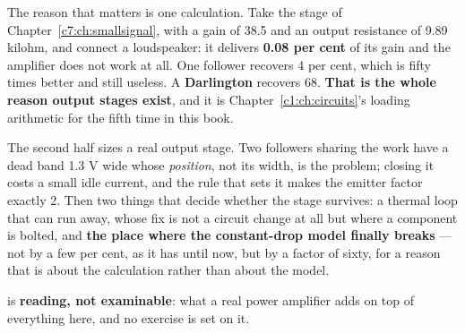 The reason that matters is one calculation. Take the stage of Chapter~\ref{c7:ch:smallsignal},
with a gain of 38.5 and an output resistance of 9.89 kilohm, and connect a loudspeaker: it delivers
\textbf{0.08 per cent} of its gain and the amplifier does not work at all. One follower recovers
4 per cent, which is fifty times better and still useless. A \textbf{Darlington} recovers 68.
\textbf{That is the whole reason output stages exist}, and it is Chapter~\ref{c1:ch:circuits}'s
loading arithmetic for the fifth time in this book.

The second half sizes a real output stage. Two followers sharing the work have a dead band 1.3 V
wide whose \emph{position}, not its width, is the problem; closing it costs a small idle current,
and the rule that sets it makes the emitter factor exactly 2. Then two things that decide whether
the stage survives: a thermal loop that can run away, whose fix is not a circuit change at all but
where a component is bolted, and \textbf{the place where the constant-drop model finally
breaks} --- not by a few per cent, as it has until now, but by a factor of sixty, for a reason that
is about the calculation rather than about the model.

 is \textbf{reading, not examinable}: what a real power amplifier adds on top of
everything here, and no exercise is set on it.






